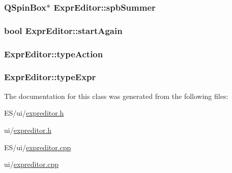 \label{class_expr_editor_ad7865d3c9c0424a319cf937265c95a68}
\hypertarget{class_expr_editor_a672fb9b691a10117939b93927cb56cef}{
\subsubsection[{spbSummer}]{\setlength{\rightskip}{0pt plus 5cm}QSpinBox$\ast$ {\bf ExprEditor::spbSummer}}}
\label{class_expr_editor_a672fb9b691a10117939b93927cb56cef}
\hypertarget{class_expr_editor_a6315823c9d42e1ae65aebc327724e489}{
\subsubsection[{startAgain}]{\setlength{\rightskip}{0pt plus 5cm}bool {\bf ExprEditor::startAgain}}}
\label{class_expr_editor_a6315823c9d42e1ae65aebc327724e489}
\hypertarget{class_expr_editor_a21311ad2ed99205ae664fcc9e975aae3}{
\subsubsection[{typeAction}]{ {\bf ExprEditor::typeAction}}}
\label{class_expr_editor_a21311ad2ed99205ae664fcc9e975aae3}
\hypertarget{class_expr_editor_a1c7b9320a532938c395d2397a09169f3}{
\subsubsection[{typeExpr}]{ {\bf ExprEditor::typeExpr}}}
\label{class_expr_editor_a1c7b9320a532938c395d2397a09169f3}


The documentation for this class was generated from the following files:\begin{DoxyCompactItemize}
\item 
ES/ui/\hyperlink{_e_s_2ui_2expreditor_8h}{expreditor.h}\item 
ui/\hyperlink{ui_2expreditor_8h}{expreditor.h}\item 
ES/ui/\hyperlink{_e_s_2ui_2expreditor_8cpp}{expreditor.cpp}\item 
ui/\hyperlink{ui_2expreditor_8cpp}{expreditor.cpp}\end{DoxyCompactItemize}
